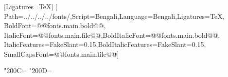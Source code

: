 \newcommand*{\ollangid}{bn}
\newcommand*{\ollanguage}{bengali}
\usepackage{fontspec}
\setmainfont{@@fonts.main.name@@}
\setsansfont{@@fonts.sans.name@@}
\setmonofont{@@fonts.mono.name@@}
\newfontfamily{}[Ligatures=TeX]
\newfontfamily{}[
  Path=../../../../fonts/,Script=Bengali,Language=Bengali,Ligatures=TeX,
  BoldFont=@@fonts.main.bold@@,
  ItalicFont=@@fonts.main.file@@,BoldItalicFont=@@fonts.main.bold@@,
  ItalicFeatures={FakeSlant=0.15},BoldItalicFeatures={FakeSlant=0.15},
  SmallCapsFont=@@fonts.main.file@@]
\usepackage[Bengali,DevanagariDanDa,BasicLatin,GeneralPunctuation]{ucharclasses}
\XeTeXcharclass"200C=\BengaliClass
\XeTeXcharclass"200D=\BengaliClass
{}
\usepackage[nonumberlist,toc,style=index]{glossaries}
\makeglossaries
